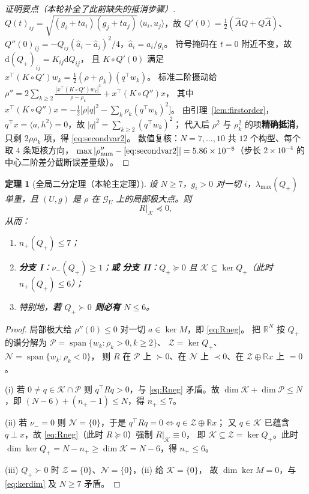 \documentclass[UTF8,11pt]{ctexart}
\newtheorem{theorem}{定理}[section]
\theoremstyle{definition}
\newcommand{\R}{\mathbb{R}}
\begin{document}
\begin{proof}[证明要点（本轮补全了此前缺失的抵消步骤）]
$Q(t)_{ij}=\sqrt{(g_i+ta_i)(g_j+ta_j)}\,\langle u_i,u_j\rangle$，故
$Q'(0)=\tfrac12(\hat AQ+Q\hat A)$、$Q''(0)_{ij}=-Q_{ij}(\hat a_i-\hat a_j)^2/4$，$\hat a_i=a_i/g_i$。
符号掩码在 $t=0$ 附近不变，故 $\mathrm d(Q_+)_{ij}=K_{ij}\mathrm dQ_{ij}$，
且 $K\circ Q'(0)$ 满足 $x^\top(K\circ Q')w_k=\tfrac12(\rho+\rho_k)(q^\top w_k)$。
标准二阶摄动给
$\rho''=2\sum_{k\ge2}\frac{|x^\top(K\circ Q')w_k|^2}{\rho-\rho_k}+x^\top(K\circ Q'')x$，
其中 $x^\top(K\circ Q'')x=-\tfrac12\bigl[\rho|q|^2-\sum_k\rho_k(q^\top w_k)^2\bigr]$。
由引理~\ref{lem:firstorder}，$q^\top x=\langle a,h^2\rangle=0$，故 $|q|^2=\sum_{k\ge2}(q^\top w_k)^2$；
代入后 $\rho^2$ 与 $\rho_k^2$ 的项\textbf{精确抵消}，只剩 $2\rho\rho_k$ 项，得 \eqref{eq:secondvar2}。
数值复核：$N=7,\dots,10$ 共 $12$ 个构型、每个取 $4$ 条矩核方向，
$\max|\rho''_{\rm num}-\eqref{eq:secondvar2}|=5.86\times10^{-8}$（步长 $2\times10^{-4}$ 的中心二阶差分截断误差量级）。
\end{proof}

\begin{theorem}[全局二分定理（本轮主定理）]\label{thm:dichotomy}
设 $N\ge7$，$g_i>0$ 对一切 $i$，$\lambda_{\max}(Q_+)$ 单重，且 $(U,g)$ 是 $\rho$ 在 $\mathcal G_U$ 上的局部极大点。则
\begin{equation}\label{eq:Rneg}
R\big|_{\mathcal K}\preceq0 ,
\end{equation}
从而：
\begin{enumerate}\itemsep2pt
\item[(i)] $n_+(Q_+)\le7$；
\item[(ii)] \textbf{分支 I}：$\nu_-(Q_+)\ge1$；\quad\textbf{或}\quad
\textbf{分支 II}：$Q_+\succeq0$ 且 $\mathcal K\subseteq\ker Q_+$（此时 $n_+(Q_+)\le6$）；
\item[(iii)] 特别地，\textbf{若 $Q_+\succ0$ 则必有 $N\le6$}。
\end{enumerate}
\end{theorem}

\begin{proof}
局部极大给 $\rho''(0)\le0$ 对一切 $a\in\ker M$，即 \eqref{eq:Rneg}。
把 $\R^N$ 按 $Q_+$ 的谱分解为
$\mathcal P=\operatorname{span}\{w_k:\rho_k>0,k\ge2\}$、
$\mathcal Z=\ker Q_+$、$\mathcal N=\operatorname{span}\{w_k:\rho_k<0\}$，
则 $R$ 在 $\mathcal P$ 上 $\succ0$、在 $\mathcal N$ 上 $\prec0$、在 $\mathcal Z\oplus\R x$ 上 $=0$。

(i) 若 $0\ne q\in\mathcal K\cap\mathcal P$ 则 $q^\top Rq>0$，与 \eqref{eq:Rneg} 矛盾。故
$\dim\mathcal K+\dim\mathcal P\le N$，即 $(N-6)+(n_+-1)\le N$，得 $n_+\le7$。

(ii) 若 $\nu_-=0$ 则 $\mathcal N=\{0\}$，于是 $q^\top Rq=0\Leftrightarrow q\in\mathcal Z\oplus\R x$；
又 $q\in\mathcal K$ 已蕴含 $q\perp x$，故 \eqref{eq:Rneg}（此时 $R\succeq0$）强制 $R|_{\mathcal K}\equiv0$，
即 $\mathcal K\subseteq\mathcal Z=\ker Q_+$。此时 $\dim\ker Q_+=N-n_+\ge\dim\mathcal K=N-6$，得 $n_+\le6$。

(iii) $Q_+\succ0$ 时 $\mathcal Z=\{0\}$、$\mathcal N=\{0\}$，(ii) 给 $\mathcal K=\{0\}$，
故 $\dim\ker M=0$，与 \eqref{eq:kerdim} 及 $N\ge7$ 矛盾。
\end{proof}
\end{document}
